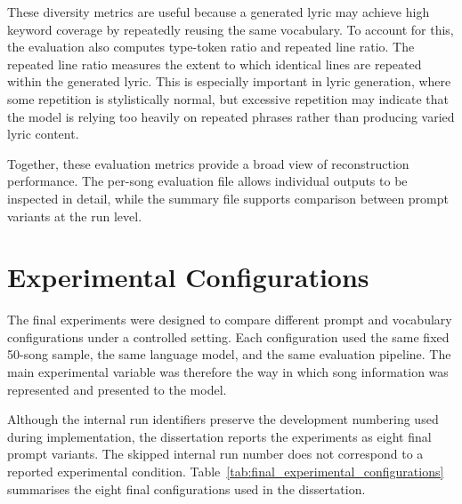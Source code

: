 These diversity metrics are useful because a generated lyric may achieve high keyword coverage by repeatedly reusing the same vocabulary. To account for this, the evaluation also computes type-token ratio and repeated line ratio. The repeated line ratio measures the extent to which identical lines are repeated within the generated lyric. This is especially important in lyric generation, where some repetition is stylistically normal, but excessive repetition may indicate that the model is relying too heavily on repeated phrases rather than producing varied lyric content.

Together, these evaluation metrics provide a broad view of reconstruction performance. The per-song evaluation file allows individual outputs to be inspected in detail, while the summary file supports comparison between prompt variants at the run level.


\section{Experimental Configurations}

The final experiments were designed to compare different prompt and vocabulary configurations under a controlled setting. Each configuration used the same fixed 50-song sample, the same language model, and the same evaluation pipeline. The main experimental variable was therefore the way in which song information was represented and presented to the model.

Although the internal run identifiers preserve the development numbering used during implementation, the dissertation reports the experiments as eight final prompt variants. The skipped internal run number does not correspond to a reported experimental condition. Table~\ref{tab:final_experimental_configurations} summarises the eight final configurations used in the dissertation.

